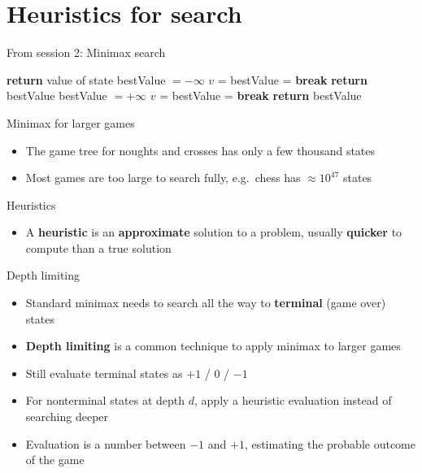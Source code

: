\part{Heuristics for search}
\frame{\partpage}

\begin{frame}{From session 2: Minimax search}
	\footnotesize
	\begin{algorithmic}
				\State \textbf{return} value of state 
				\State bestValue $= -\infty$ 
					\State $v$ =  
					\State bestValue =  
						\State \textbf{break}
					\EndIf
				\EndFor
				\State \textbf{return} bestValue 
				\State bestValue $= +\infty$
					\State $v$ = 
					\State bestValue = 
						\State \textbf{break}
					\EndIf
				\EndFor
				\State \textbf{return} bestValue 
			\EndIf
		\EndProcedure
	\end{algorithmic}
\end{frame}

\begin{frame}{Minimax for larger games}
	\begin{itemize}
		\pause\item The game tree for noughts and crosses has only a few thousand states
		\pause\item Most games are too large to search fully, e.g.\ chess has $\approx 10^{47}$ states
	\end{itemize}
\end{frame}

\begin{frame}{Heuristics}
	\begin{itemize}
		\pause\item A \textbf{heuristic} is an \textbf{approximate} solution to a problem,
			usually \textbf{quicker} to compute than a true solution
	\end{itemize}
\end{frame}

\begin{frame}{Depth limiting}
	\begin{itemize}
		\pause\item Standard minimax needs to search all the way to \textbf{terminal} (game over) states
		\pause\item \textbf{Depth limiting} is a common technique to apply minimax to larger games
		\pause\item Still evaluate terminal states as $+1$ / $0$ / $-1$
		\pause\item For nonterminal states at depth $d$, apply a heuristic evaluation instead of searching deeper
		\pause\item Evaluation is a number between $-1$ and $+1$, estimating the probable outcome of the game
	\end{itemize}
\end{frame}

